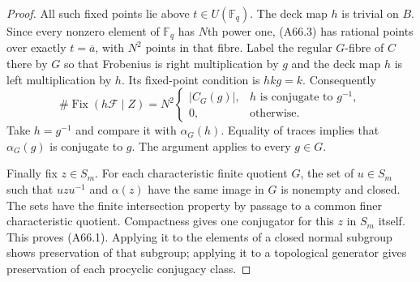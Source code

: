 \begin{proof}
All such fixed points lie above $t\in U(\mathbb F_q)$.
The deck map $h$ is trivial on $B$.
Since every nonzero element of $\mathbb F_q$
has $N$th power one, (A66.3) has rational points
over exactly $t=\overline a$, with $N^2$ points
in that fibre. Label the regular $G$-fibre
of $C$ there by $G$ so that Frobenius is right
multiplication by $g$ and the deck map $h$ is
left multiplication by $h$.
Its fixed-point condition is $hkg=k$.
Consequently
\[
 \#\operatorname{Fix}(h\mathcal F\mid Z)
  =N^2
    \begin{cases}
      |C_G(g)|,&h\text{ is conjugate to }g^{-1},\\
      0,&\text{otherwise}.
    \end{cases}                                      \tag{A66.5}
\]
Take $h=g^{-1}$ and compare it with
$\alpha_G(h)$. Equality of traces implies that
$\alpha_G(g)$ is conjugate to $g$.
The argument applies to every $g\in G$.

Finally fix $z\in S_m$. For each characteristic
finite quotient $G$, the set of $u\in S_m$ such
that $u z u^{-1}$ and $\alpha(z)$ have the same
image in $G$ is nonempty and closed.
The sets have the finite intersection property
by passage to a common finer characteristic
quotient. Compactness gives one conjugator for
this $z$ in $S_m$ itself. This proves (A66.1).
Applying it to the elements of a closed normal
subgroup shows preservation of that subgroup;
applying it to a topological generator gives
preservation of each procyclic conjugacy class.
\end{proof}

